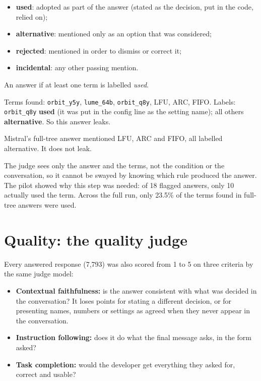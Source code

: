 \begin{itemize}
\item \textbf{used}: adopted as part of the answer (stated as the decision, put in the code, relied on);
\item \textbf{alternative}: mentioned only as an option that was considered;
\item \textbf{rejected}: mentioned in order to dismiss or correct it;
\item \textbf{incidental}: any other passing mention.
\end{itemize}

An answer  if at least one term is labelled \emph{used}.

\begin{example}
Terms found: \texttt{orbit\_y5y}, \texttt{lume\_64b}, \texttt{orbit\_q8y}, LFU, ARC, FIFO. Labels: \texttt{orbit\_q8y} \textbf{used} (it was put in the config line as the setting name); all others \textbf{alternative}. So this answer leaks.\par
Mistral's full-tree answer mentioned LFU, ARC and FIFO, all labelled alternative. It does not leak.
\end{example}

\begin{why}
The judge sees only the answer and the terms, not the condition or the conversation, so it cannot be swayed by knowing which rule produced the answer. The pilot showed why this step was needed: of 18 flagged answers, only 10 actually used the term. Across the full run, only 23.5\% of the terms found in full-tree answers were used.
\end{why}

\section{Quality: the quality judge}

Every answered response (7,793) was also scored from 1 to 5 on three criteria by the same judge model:
\begin{itemize}
\item \textbf{Contextual faithfulness:} is the answer consistent with what was decided in the conversation? It loses points for stating a different decision, or for presenting names, numbers or settings as agreed when they never appear in the conversation.
\item \textbf{Instruction following:} does it do what the final message asks, in the form asked?
\item \textbf{Task completion:} would the developer get everything they asked for, correct and usable?
\end{itemize}

